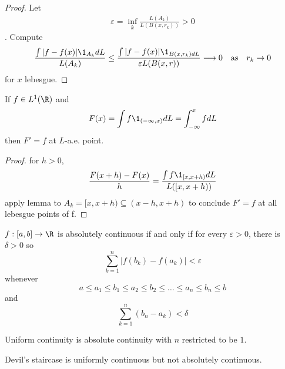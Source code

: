 \begin{proof}
	Let
	\begin{align*}
		\varepsilon = \inf_{k} \frac{L(A_k)}{L(B(x,r_k))} > 0
	\end{align*}. Compute
	\begin{align*}
		\frac{\int | f - f(x) | \1_{A_k} dL}{L(A_k)} \leq \frac{\int |f - f(x) | \1_{B(x,r_k) dL}}{\varepsilon L(B(x,r))}
		\longrightarrow 0 \quad \text{as} \quad r_k \to 0
	\end{align*}
	for $x$ lebesgue.
\end{proof}


\begin{corollary}
	If $f \in L^1(\R)$ and
	\[
		F(x) = \int f \1_{(-\infty, x)} dL = \int_{-\infty}^{x} f dL
	\] then
	$F' = f$ at $L$-a.e. point.
\end{corollary}

\begin{proof}
	for $h > 0$,
	 \[
		\frac{F(x +h) - F(x)}{h} = \frac{\int f \1_{[x,x+h)} dL}{L([x,x+h))}
	\]
	apply lemma to $A_k = [x, x+h) \subseteq (x-h, x+h)$ to conclude $F' = f$ at all lebesgue points of f.
\end{proof}




\begin{definition}
	$f: [a,b] \to \R$ is absolutely continuous if and only if for every $\varepsilon > 0$, there is $\delta > 0$ so
	\[
		\sum_{k=1}^n |f(b_{k}) - f(a_k) | < \varepsilon
	\]whenever
	\[
		a \leq a_1 \leq b_1 \leq a_2 \leq b_2 \leq \ldots \leq a_n \leq b_n \leq b
	\] and
	\[
		\sum_{k=1}^n (b_n - a_k) < \delta
	\]
\end{definition}

\begin{remark}
	Uniform continuity is absolute continuity with $n$ restricted to be $1$.
\end{remark}

\begin{example}
	Devil's staircase is uniformly continuous but not absolutely continuous.
\end{example}



